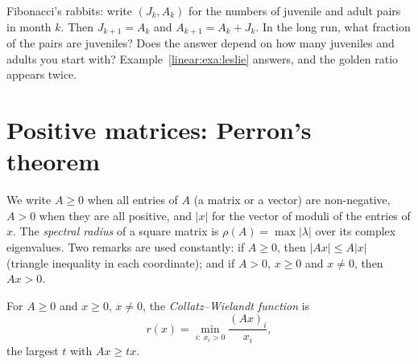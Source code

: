 \begin{think}
Fibonacci's rabbits: write $(J_k,A_k)$ for the numbers of juvenile and adult pairs in month $k$. Then $J_{k+1}=A_k$ and
$A_{k+1}=A_k+J_k$. In the long run, what fraction of the pairs are juveniles? Does the answer depend on how many juveniles
and adults you start with? Example~\ref{linear:exa:leslie} answers, and the golden ratio appears twice.
\end{think}

\section{Positive matrices: Perron's theorem}

We write $A\ge0$ when all entries of $A$ (a matrix or a vector) are non-negative, $A>0$ when they are all positive, and
$|x|$ for the vector of moduli of the entries of $x$. The \emph{spectral radius} of a square matrix is $\rho(A)=\max|\lambda|$
over its complex eigenvalues. Two remarks are used constantly: if $A\ge0$, then $|Ax|\le A|x|$ (triangle inequality in each
coordinate); and if $A>0$, $x\ge0$ and $x\ne0$, then $Ax>0$.

For $A\ge0$ and $x\ge0$, $x\ne0$, the \emph{Collatz--Wielandt function} is
\[
r(x)=\min_{i:\ x_i>0}\frac{(Ax)_i}{x_i},
\]
the largest $t$ with $Ax\ge tx$.

